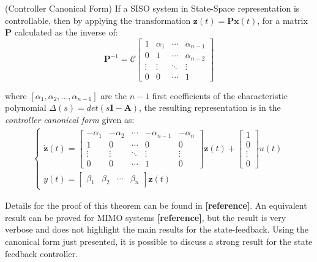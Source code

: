 \documentclass[a4paper,11pt]{book}
\numberwithin{figure}{chapter}
\numberwithin{equation}{chapter}
\numberwithin{table}{chapter}
\newtheorem{theorem}{Theorem}[chapter]
\theoremstyle{definition}
\newcounter{boxed-theorem}
\newenvironment{boxed-theorem}[1]
{\begin{shaded} \begin{theorem}{#1}}
{\end{theorem} \end{shaded}}
\newcounter{boxed-definition}
\begin{document}
\begin{boxed-theorem}{(Controller Canonical Form)} \label{th:controlCanon}
	If a SISO system in State-Space representation is controllable, then by applying the transformation $\bm{z}(t) = \bm{P}\bm{x}(t)$, for a matrix $\bm{P}$ calculated as the inverse of:
	\begin{equation}
		\bm{P}^{-1} = \bm{\mathcal{C}} \begin{bmatrix}
		1 & \alpha_1 & \cdots  & \alpha_{n-1} \\
		0 & 1 & \cdots & \alpha_{n-2} \\
		\vdots & \vdots & \ddots & \vdots \\
		0 & 0 & \cdots &1
		\end{bmatrix}
	\end{equation}
	
	\noindent where $[\alpha_1, \alpha_2, ..., \alpha_{n-1}]$ are the $n-1$ first coefficients of the characteristic polynomial $\Delta(s) = det(s\bm{I} - \bm{A})$, the resulting representation is in the \textit{controller canonical form} given as:
	\begin{align}
	\begin{cases}
		\dot{\bm{z}}(t) = \begin{bmatrix}
			-\alpha_1 & -\alpha_2 & \cdots & -\alpha_{n-1} & -\alpha_n \\
			1 & 0 & \cdots & 0 & 0 \\
			\vdots & \vdots & \ddots & \vdots & \vdots \\
			0 & 0 & \cdots & 1 & 0 
		\end{bmatrix} \bm{z}(t) + \begin{bmatrix}
			1 \\ 0 \\ \vdots \\ 0
		\end{bmatrix} u(t) \\
		y(t) = \begin{bmatrix} \beta_1 & \beta_2 & \cdots & \beta_n \end{bmatrix} \bm{z}(t)
	\end{cases}
	\end{align}
\end{boxed-theorem} 

Details for the proof of this theorem can be found in \textbf{[reference]}. An equivalent result can be proved for MIMO systems \textbf{[reference]}, but the result is very verbose and does not highlight the main results for the state-feedback. Using the canonical form just presented, it is possible to discuss a strong result for the state feedback controller.
\end{document}
